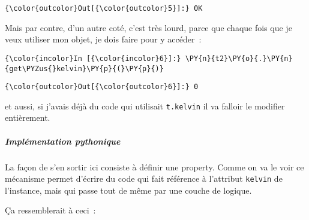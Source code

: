 \begin{Verbatim}[commandchars=\\\{\}]
{\color{outcolor}Out[{\color{outcolor}5}]:} 0K
\end{Verbatim}
            
    Mais par contre, d'un autre coté, c'est très lourd, parce que chaque
fois que je veux utiliser mon objet, je dois faire pour y accéder~:

    \begin{Verbatim}[commandchars=\\\{\}]
{\color{incolor}In [{\color{incolor}6}]:} \PY{n}{t2}\PY{o}{.}\PY{n}{get\PYZus{}kelvin}\PY{p}{(}\PY{p}{)}
\end{Verbatim}


\begin{Verbatim}[commandchars=\\\{\}]
{\color{outcolor}Out[{\color{outcolor}6}]:} 0
\end{Verbatim}
            
    et aussi, si j'avais déjà du code qui utilisait \texttt{t.kelvin} il va
falloir le modifier entièrement.

    \hypertarget{impluxe9mentation-pythonique}{%
\subparagraph{Implémentation
pythonique}\label{impluxe9mentation-pythonique}}

    La façon de s'en sortir ici consiste à définir une property. Comme on va
le voir ce mécanisme permet d'écrire du code qui fait référence à
l'attribut \texttt{kelvin} de l'instance, mais qui passe tout de même
par une couche de logique.

Ça ressemblerait à ceci~:

